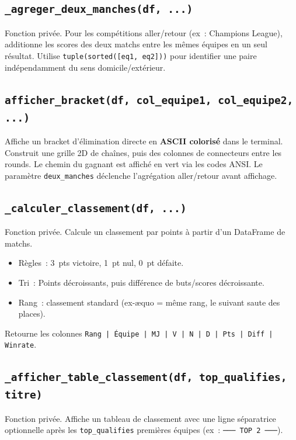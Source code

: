 \documentclass[12pt,a4paper]{article}
\begin{document}
\subsection{\texttt{\_agreger\_deux\_manches(df, ...)}}

Fonction privée. Pour les compétitions aller/retour (ex~: Champions League),
additionne les scores des deux matchs entre les mêmes équipes en un seul
résultat. Utilise \texttt{tuple(sorted([eq1, eq2]))} pour identifier une paire
indépendamment du sens domicile/extérieur.

\subsection{\texttt{afficher\_bracket(df, col\_equipe1, col\_equipe2, ...)}}

Affiche un bracket d'élimination directe en \textbf{ASCII colorisé} dans le
terminal. Construit une grille 2D de chaînes, puis des colonnes de connecteurs
entre les rounds. Le chemin du gagnant est affiché en vert via les codes ANSI.
Le paramètre \texttt{deux\_manches} déclenche l'agrégation aller/retour avant
affichage.

\subsection{\texttt{\_calculer\_classement(df, ...)}}

Fonction privée. Calcule un classement par points à partir d'un DataFrame de
matchs.
\begin{itemize}
    \item Règles~: 3~pts victoire, 1~pt nul, 0~pt défaite.
    \item Tri~: Points décroissants, puis différence de buts/scores décroissante.
    \item Rang~: classement standard (ex-æquo = même rang, le suivant saute
    des places).
\end{itemize}
Retourne les colonnes \texttt{Rang | Équipe | MJ | V | N | D | Pts | Diff |
Winrate}.

\subsection{\texttt{\_afficher\_table\_classement(df, top\_qualifies, titre)}}

Fonction privée. Affiche un tableau de classement avec une ligne séparatrice
optionnelle après les \texttt{top\_qualifies} premières équipes
(ex~: \texttt{─── TOP 2 ───}).
\end{document}
